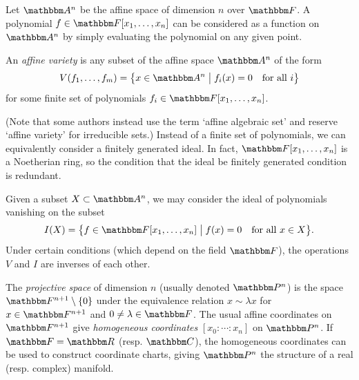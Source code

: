 \documentclass[11pt,titlepage]{article}
\newcommand*{\vbar}{\;\big\vert\;}
\begin{document}
    Let $\A^n$ be the affine space of dimension $n$ over $\F$.  A polynomial $f
    \in \F[x_1, \ldots, x_n]$ can be considered as a function on $\A^n$ by
    simply evaluating the polynomial on any given point.

    \begin{definition}
        An \emph{affine variety} is any subset of the affine space $\A^n$ of the
        form
        \[
            V(f_1, \ldots, f_m)
            = \cdil[\big]{x \in \A^n \vbar f_i(x) = 0 \quad\text{for all $i$}}
        \]
        for some finite set of polynomials $f_i \in \F[x_1, \ldots, x_n]$.
    \end{definition}
    \noindent (Note that some authors instead use the term `affine algebraic
    set' and reserve `affine variety' for irreducible sets.) Instead of a finite
    set of polynomials, we can equivalently consider a finitely generated ideal.
    In fact, $\F[x_1,\ldots,x_n]$ is a Noetherian ring, so the condition that
    the ideal be finitely generated condition is redundant.

    Given a subset $X \subset \A^n$, we may consider the ideal of polynomials
    vanishing on the subset
    \[
        I(X) = \cdil[\big]{f \in \F[x_1, \ldots, x_n] \vbar f(x) = 0 \quad\text{for
        all $x \in X$}}.
    \]
    Under certain conditions (which depend on the field $\F$), the operations
    $V$ and $I$ are inverses of each other.

    \begin{definition}
        The \emph{projective space} of dimension $n$ (usually denoted $\Proj^n$)
        is the space $\F^{n+1}\setminus \{0\}$ under the equivalence relation $x
        \sim \lambda x$ for $x \in \F^{n+1}$ and $0 \ne \lambda \in \F$.  The
        usual affine coordinates on $\F^{n+1}$ give \emph{homogeneous
        coordinates} $[x_0: \cdots: x_n]$ on $\Proj^n$.  If $\F = \R$ (resp.
        $\C$), the homogeneous coordinates can be used to construct coordinate
        charts, giving $\Proj^n$ the structure of a real (resp. complex)
        manifold.
    \end{definition}
\end{document}
